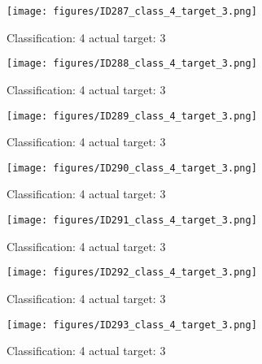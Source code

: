 \begin{figure}[h!]
\begin{center}
\texttt{[image: figures/ID287\_class\_4\_target\_3.png]}
\end{center}
\caption{ Classification: 4 actual target: 3}
\label{fig:ID287_class_4_target_3}
\end{figure}
\begin{figure}[h!]
\begin{center}
\texttt{[image: figures/ID288\_class\_4\_target\_3.png]}
\end{center}
\caption{ Classification: 4 actual target: 3}
\label{fig:ID288_class_4_target_3}
\end{figure}
\begin{figure}[h!]
\begin{center}
\texttt{[image: figures/ID289\_class\_4\_target\_3.png]}
\end{center}
\caption{ Classification: 4 actual target: 3}
\label{fig:ID289_class_4_target_3}
\end{figure}
\begin{figure}[h!]
\begin{center}
\texttt{[image: figures/ID290\_class\_4\_target\_3.png]}
\end{center}
\caption{ Classification: 4 actual target: 3}
\label{fig:ID290_class_4_target_3}
\end{figure}
\begin{figure}[h!]
\begin{center}
\texttt{[image: figures/ID291\_class\_4\_target\_3.png]}
\end{center}
\caption{ Classification: 4 actual target: 3}
\label{fig:ID291_class_4_target_3}
\end{figure}
\begin{figure}[h!]
\begin{center}
\texttt{[image: figures/ID292\_class\_4\_target\_3.png]}
\end{center}
\caption{ Classification: 4 actual target: 3}
\label{fig:ID292_class_4_target_3}
\end{figure}
\begin{figure}[h!]
\begin{center}
\texttt{[image: figures/ID293\_class\_4\_target\_3.png]}
\end{center}
\caption{ Classification: 4 actual target: 3}
\label{fig:ID293_class_4_target_3}
\end{figure}
